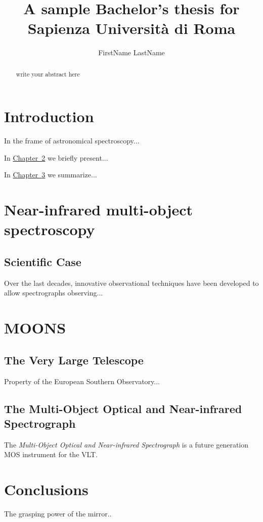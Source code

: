 \documentclass[english, Lau, oneside]{sapthesis}%
\title{A sample Bachelor's thesis for Sapienza Università di Roma}
\author{FirstName LastName}
\begin{document}
\frontmatter
\maketitle

\begin{abstract}
write your abstract here
\end{abstract}

\tableofcontents

\mainmatter
\chapter{Introduction}
\lettrine[lines=2, findent=3pt, nindent=0pt]{I}{}n the frame of astronomical spectroscopy...

\bigskip
In \hyperref[chap:1]{Chapter~\ref*{chap:1}} we  briefly present...

\bigskip
In \hyperref[chap:2]{Chapter~\ref*{chap:2}} we summarize...

\chapter{Near-infrared multi-object spectroscopy}
\label{chap:1} 
\section{Scientific Case}
\label{sec:caso}
Over the last decades, innovative observational techniques have been developed to allow spectrographs observing...

\chapter{MOONS}
\label{chap:2}
\section{The Very Large Telescope}
Property of the European Southern Observatory...

\section{The Multi-Object Optical and Near-infrared Spectrograph}
\label{sec:moons}

The \textit{Multi-Object Optical and Near-infrared Spectrograph} is a future generation MOS instrument for the VLT. 

\chapter{Conclusions}
The grasping power of the mirror..
\end{document}
